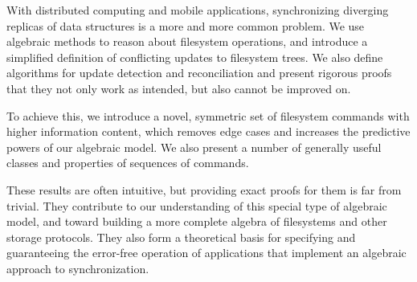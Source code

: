 
With distributed computing and mobile applications,
synchronizing diverging replicas of data structures is a more and more common problem.
We use algebraic methods to reason about filesystem operations, 
and introduce a simplified definition of conflicting updates to filesystem trees.
We also define algorithms for update detection and reconciliation
and present rigorous proofs that they not only work as intended,
but also cannot be improved on.

To achieve this, we introduce a novel, symmetric set of filesystem commands
with higher information content,
which removes edge cases
and increases the predictive powers of our algebraic model.
We also present a number of generally useful classes and properties
of sequences of commands.

These results are often intuitive,
but providing exact proofs for them is far from trivial.
They contribute to our understanding of this special type of algebraic model,
and toward building a more complete algebra
of filesystems and other storage protocols.
They also form a theoretical basis for
specifying
and guaranteeing the error-free operation
of applications that implement an algebraic approach to synchronization.
